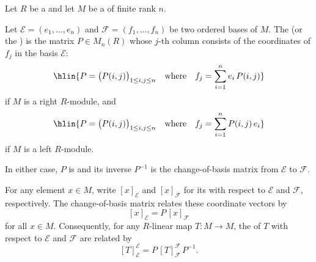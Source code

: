 \begin{definition} \label{definition:change_of_basis_matrix_for_a_free_module_over_a_ring}
    Let $R$ be a  and let $M$ be a  of finite rank $n$.


    Let $\mathcal{E} = (e_1,\ldots,e_n)$ and $\mathcal{F} = (f_1,\ldots,f_n)$ be two ordered bases of $M$. The  (or the ) is the matrix $P \in M_n(R)$ whose $j$-th column consists of the coordinates of $f_j$ in the basis $\mathcal{E}$:
    $$\hlin{P = \bigl( P(i,j) \bigr)_{1 \leq i,j \leq n} \quad \text{where} \quad f_j = \sum_{i=1}^n e_i \, P(i,j)}$$
    if $M$ is a right $R$-module, and
    $$\hlin{P = \bigl( P(i,j) \bigr)_{1 \leq i,j \leq n} \quad \text{where} \quad f_j = \sum_{i=1}^n P(i,j) \, e_i}$$
    if $M$ is a left $R$-module.

    In either case, $P$ is  and its inverse $P^{-1}$ is the change-of-basis matrix from $\mathcal{E}$ to $\mathcal{F}$.

    For any element $x \in M$, write $[x]_\mathcal{E}$ and $[x]_\mathcal{F}$ for its  with respect to $\mathcal{E}$ and $\mathcal{F}$, respectively. The change-of-basis matrix relates these coordinate vectors by
    $$[x]_\mathcal{E} = P \, [x]_\mathcal{F}$$
    for all $x \in M$. Consequently, for any $R$-linear map $T: M \to M$, the  of $T$ with respect to $\mathcal{E}$ and $\mathcal{F}$ are related by
    $$[T]_\mathcal{E}^\mathcal{E} = P \, [T]_\mathcal{F}^\mathcal{F} \, P^{-1}.$$
\end{definition}
